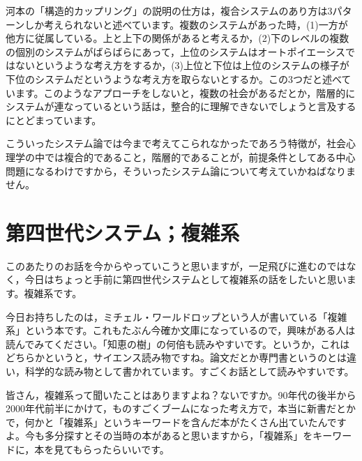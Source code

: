 \documentclass{ltjsbook}
\begin{document}
河本\parencite{KawamotoHideo}の「構造的カップリング」の説明の仕方は，複合システムのあり方は3パターンしか考えられないと述べています。複数のシステムがあった時，(1)一方が他方に従属している。上と上下の関係があると考えるか，(2)下のレベルの複数の個別のシステムがばらばらにあって，上位のシステムはオートポイエーシスではないというような考え方をするか，(3)上位と下位は上位のシステムの様子が下位のシステムだというような考え方を取らないとするか。この3つだと述べています。このようなアプローチをしないと，複数の社会があるだとか，階層的にシステムが連なっているという話は，整合的に理解できないでしょうと言及するにとどまっています。

こういったシステム論では今まで考えてこられなかったであろう特徴が，社会心理学の中では複合的であること，階層的であることが，前提条件としてある中心問題になるわけですから，そういったシステム論について考えていかねばなりません。

\section{第四世代システム；複雑系}

このあたりのお話を今からやっていこうと思いますが，一足飛びに進むのではなく，今日はちょっと手前に第四世代システムとして複雑系の話をしたいと思います。複雑系です。

今日お持ちしたのは，ミチェル・ワールドロップという人が書いている「複雑系」という本です\parencite{Waldrop}。これもたぶん今確か文庫になっているので，興味がある人は読んでみてください。「知恵の樹」\parencite{Chienoki}の何倍も読みやすいです。というか，これはどちらかというと，サイエンス読み物ですね。論文だとか専門書というのとは違い，科学的な読み物として書かれています。すごくお話として読みやすいです。

皆さん，複雑系って聞いたことはありますよね？ないですか。90年代の後半から2000年代前半にかけて，ものすごくブームになった考え方で，本当に新書だとかで，何かと「複雑系」というキーワードを含んだ本がたくさん出ていたんですよ。今も多分探すとその当時の本があると思いますから，「複雑系」をキーワードに，本を見てもらったらいいです。
\end{document}
